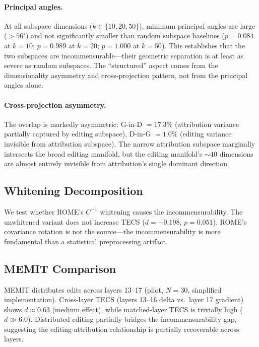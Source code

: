 \paragraph{Principal angles.}
At all subspace dimensions ($k \in \{10, 20, 50\}$), minimum principal angles are large ($>56^\circ$) and not significantly smaller than random subspace baselines ($p = 0.084$ at $k{=}10$; $p = 0.989$ at $k{=}20$; $p = 1.000$ at $k{=}50$).
This establishes that the two subspaces are incommensurable---their geometric separation is at least as severe as random subspaces.
The ``structured'' aspect comes from the dimensionality asymmetry and cross-projection pattern, not from the principal angles alone.

\paragraph{Cross-projection asymmetry.}
The overlap is markedly asymmetric: G-in-D $= 17.3\%$ (attribution variance partially captured by editing subspace), D-in-G $= 1.0\%$ (editing variance invisible from attribution subspace).
The narrow attribution subspace marginally intersects the broad editing manifold, but the editing manifold's ${\sim}40$ dimensions are almost entirely invisible from attribution's single dominant direction.

\subsection{Whitening Decomposition}
\label{sec:whitening}

We test whether ROME's $C^{-1}$ whitening causes the incommensurability.
The unwhitened variant does not increase TECS ($d = -0.198$, $p = 0.051$).
ROME's covariance rotation is not the source---the incommensurability is more fundamental than a statistical preprocessing artifact.

\subsection{MEMIT Comparison}
\label{sec:memit}

MEMIT distributes edits across layers 13--17 (pilot, $N{=}30$, simplified implementation).
Cross-layer TECS (layers 13--16 delta vs.\ layer 17 gradient) shows $d \approx 0.63$ (medium effect), while matched-layer TECS is trivially high ($d \gg 6.0$).
Distributed editing partially bridges the incommensurability gap, suggesting the editing-attribution relationship is partially recoverable across layers.

